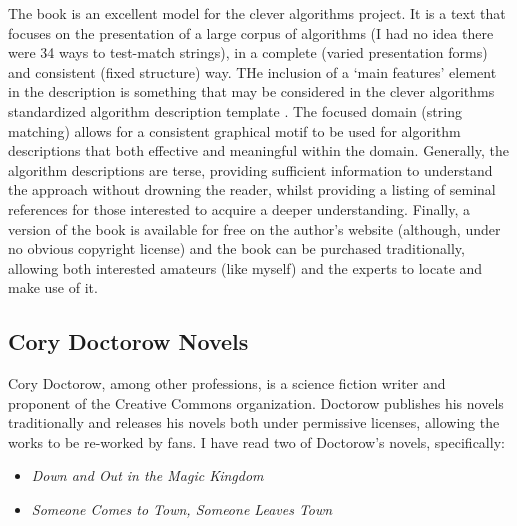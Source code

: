 \documentclass[a4paper, 11pt]{article}
\begin{document}
The book is an excellent model for the clever algorithms project. It is a text that focuses on the presentation of a large corpus of algorithms (I had no idea there were 34 ways to test-match strings), in a complete (varied presentation forms) and consistent (fixed structure) way. THe inclusion of a `main features' element in the description is something that may be considered in the clever algorithms standardized algorithm description template \cite{Brownlee2010a}. The focused domain (string matching) allows for a consistent graphical motif to be used for algorithm descriptions that both effective and meaningful within the domain. Generally, the algorithm descriptions are terse, providing sufficient information to understand the approach without drowning the reader, whilst providing a listing of seminal references for those interested to acquire a deeper understanding. Finally, a version of the book is available for free on the author's website (although, under no obvious copyright license) and the book can be purchased traditionally, allowing both interested amateurs (like myself) and the experts to locate and make use of it.

% 
% 
\subsection{Cory Doctorow Novels}
\label{subsec:doctorow}
Cory Doctorow, among other professions, is a science fiction writer and proponent of the Creative Commons organization. Doctorow publishes his novels traditionally and releases his novels both under permissive licenses, allowing the works to be re-worked by fans. I have read two of Doctorow's novels, specifically: 

\begin{itemize}
	\item \emph{Down and Out in the Magic Kingdom} \cite{Doctorow2003}
	\item \emph{Someone Comes to Town, Someone Leaves Town} \cite{Doctorow2006}
\end{itemize}
\end{document}
